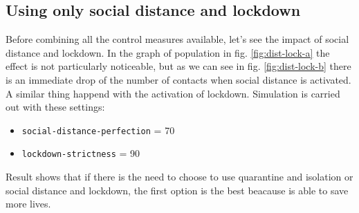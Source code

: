 \documentclass[12pt]{llncs}
\begin{document}
\subsection{Using only social distance and lockdown}
Before combining all the control measures available, let's see the impact of social distance and lockdown. In the graph of population in fig. \ref{fig:dist-lock-a} the effect is not particularly noticeable, but as we can see in fig. \ref{fig:dist-lock-b} there is an immediate drop of the number of contacts when social distance is activated. A similar thing happend with the activation of lockdown. Simulation is carried out with these settings:
\begin{itemize}
\item \texttt{social-distance-perfection} = 70
\item \texttt{lockdown-strictness} = 90
\end{itemize}

Result shows that if there is the need to choose to use quarantine and isolation or social distance and lockdown, the first option is the best beacause is able to save more lives.
\end{document}
